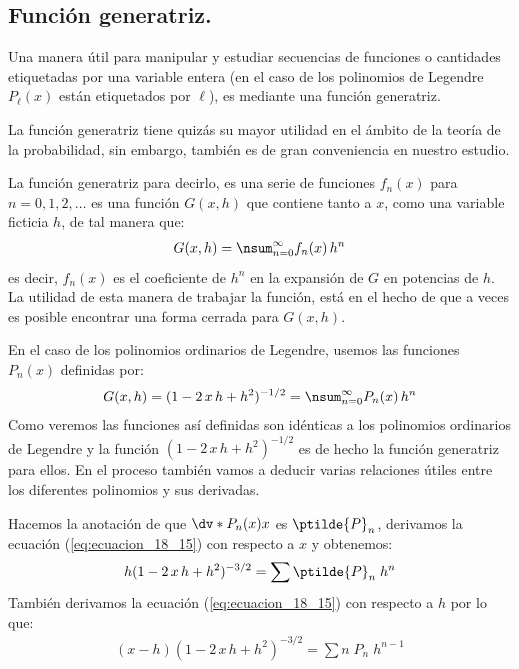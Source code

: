 \subsection{Función generatriz.}

Una manera útil para manipular y estudiar secuencias de funciones o cantidades etiquetadas por una variable entera (en el caso de los polinomios de Legendre $P_{\ell} (x)$ están etiquetados por $\ell$), es mediante una función generatriz. 
\par
La función generatriz tiene quizás su mayor utilidad en el ámbito de la teoría de la probabilidad, sin embargo, también es de gran conveniencia en nuestro estudio.
\par
La función generatriz para decirlo, es una serie de funciones $f_{n} (x)$ para $n = 0, 1, 2,\ldots$ es una función $G (x, h)$ que contiene tanto a $x$, como una variable ficticia $h$, de tal manera que:
\begin{align*}
G(x,h) = \nsum_{n=0}^{\infty} f_{n} (x) \, h^{n}
\end{align*}
es decir, $f_{n}(x)$ es el coeficiente de $h^{n}$ en la expansión de $G$ en potencias de $h$. La utilidad de esta manera de trabajar la función, está en el hecho de que a veces es posible encontrar una forma cerrada para $G(x, h)$.
\par
En el caso de los polinomios ordinarios de Legendre, usemos las funciones $P_{n}(x)$ definidas por:
\begin{align}
G(x ,h) = (1 - 2 \, x \, h + h^{2})^{-1/2} =  \nsum_{n=0}^{\infty} P_{n}(x) \, h^{n}
\label{eq:ecuacion_18_15}
\end{align}
Como veremos las funciones así definidas son idénticas a los polinomios ordinarios de Legendre y la función $(1 - 2 \, x \, h + h^{2})^{-1/2}$ es de hecho la función generatriz para ellos. En el proceso también vamos a deducir varias relaciones útiles entre los diferentes polinomios y sus derivadas.
\par
Hacemos la anotación de que $\dv*{P_{n}(x)}{x}$ es $\ptilde{P}_{n}$, derivamos la ecuación (\ref{eq:ecuacion_18_15}) con respecto a $x$ y obtenemos:
\begin{align}
h (1 - 2 \, x \, h + h^{2})^{-3/2} = \sum \ptilde{P}_{n} \; h^{n}
\label{eq:ecuacion_18_16}
\end{align}
También derivamos la ecuación (\ref{eq:ecuacion_18_15}) con respecto a $h$ por lo que:
\begin{align}
(x - h) (1 - 2 \, x \, h + h^{2})^{-3/2} = \sum n \; P_{n} \; h^{n-1}
\label{eq:ecuacion_18_17}
\end{align}
